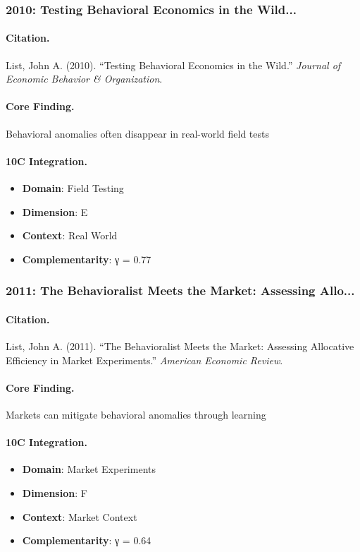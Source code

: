 \subsubsection{2010: Testing Behavioral Economics in the Wild...}

\paragraph{Citation.}
List, John A. (2010). ``Testing Behavioral Economics in the Wild.''
\textit{Journal of Economic Behavior & Organization}.

\paragraph{Core Finding.}
Behavioral anomalies often disappear in real-world field tests

\paragraph{10C Integration.}
\begin{itemize}[nosep]
  \item \textbf{Domain}: Field Testing
  \item \textbf{Dimension}: E
  \item \textbf{Context}: Real World
  \item \textbf{Complementarity}: γ = 0.77
\end{itemize}


\subsubsection{2011: The Behavioralist Meets the Market: Assessing Allo...}

\paragraph{Citation.}
List, John A. (2011). ``The Behavioralist Meets the Market: Assessing Allocative Efficiency in Market Experiments.''
\textit{American Economic Review}.

\paragraph{Core Finding.}
Markets can mitigate behavioral anomalies through learning

\paragraph{10C Integration.}
\begin{itemize}[nosep]
  \item \textbf{Domain}: Market Experiments
  \item \textbf{Dimension}: F
  \item \textbf{Context}: Market Context
  \item \textbf{Complementarity}: γ = 0.64
\end{itemize}



